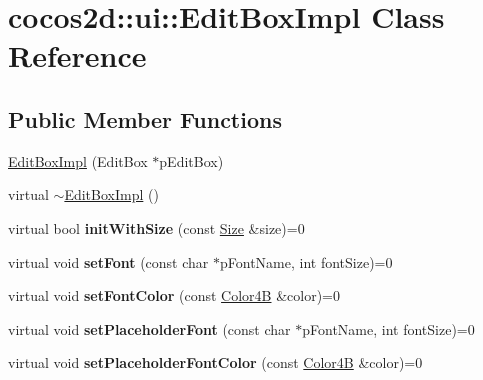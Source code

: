 \hypertarget{classcocos2d_1_1ui_1_1EditBoxImpl}{}\section{cocos2d\+:\+:ui\+:\+:Edit\+Box\+Impl Class Reference}
\label{classcocos2d_1_1ui_1_1EditBoxImpl}
\subsection*{Public Member Functions}
\begin{DoxyCompactItemize}
\item 
\hyperlink{classcocos2d_1_1ui_1_1EditBoxImpl_a17428b425795ede3896056fd521c5cd4}{Edit\+Box\+Impl} (Edit\+Box $\ast$p\+Edit\+Box)
\item 
virtual \hyperlink{classcocos2d_1_1ui_1_1EditBoxImpl_afd129ad831a993e7bf076f716fa5e275}{$\sim$\+Edit\+Box\+Impl} ()
\item 
\mbox{\label{classcocos2d_1_1ui_1_1EditBoxImpl_ad0ac7f338b202d899b6fd6840923ac77}} 
virtual bool {\bfseries init\+With\+Size} (const \hyperlink{classSize}{Size} \&size)=0
\item 
\mbox{\label{classcocos2d_1_1ui_1_1EditBoxImpl_a4df60b8814b48a26909ceb4413b14154}} 
virtual void {\bfseries set\+Font} (const char $\ast$p\+Font\+Name, int font\+Size)=0
\item 
\mbox{\label{classcocos2d_1_1ui_1_1EditBoxImpl_a860eeaedf1a515ecdb2cec2487c57070}} 
virtual void {\bfseries set\+Font\+Color} (const \hyperlink{structColor4B}{Color4B} \&color)=0
\item 
\mbox{\label{classcocos2d_1_1ui_1_1EditBoxImpl_ad88ce793a7c805c978746c48227929c9}} 
virtual void {\bfseries set\+Placeholder\+Font} (const char $\ast$p\+Font\+Name, int font\+Size)=0
\item 
\mbox{\label{classcocos2d_1_1ui_1_1EditBoxImpl_ad5d4014b8c6bf2c6eb40ecd5485ce6cb}} 
virtual void {\bfseries set\+Placeholder\+Font\+Color} (const \hyperlink{structColor4B}{Color4B} \&color)=0
\item 
\mbox{\label{classcocos2d_1_1ui_1_1EditBoxImpl_a38f9120065cbce17dc918b5b78e1d47b}} 

\end{DoxyCompactItemize}
